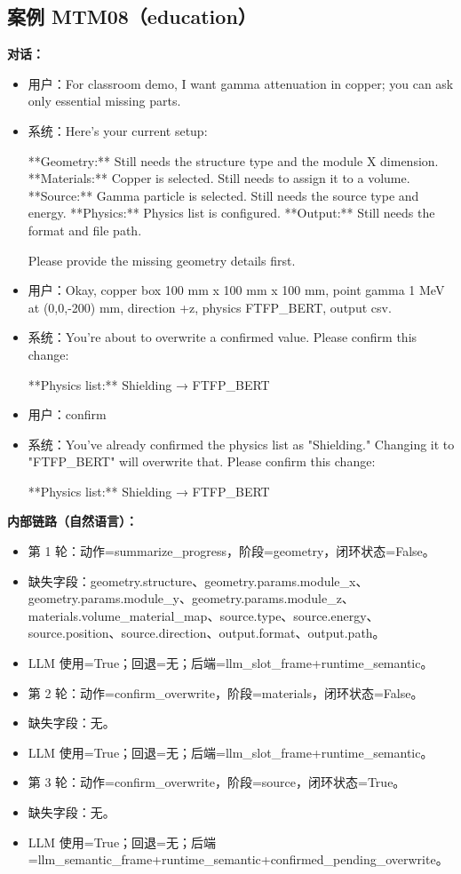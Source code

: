 \documentclass[11pt]{ctexart}
\begin{document}
\subsection{案例 MTM08（education）}
\textbf{对话：}
\begin{itemize}
\item 用户：For classroom demo, I want gamma attenuation in copper; you can ask only essential missing parts.
\item 系统：Here's your current setup:

**Geometry:** Still needs the structure type and the module X dimension.
**Materials:** Copper is selected. Still needs to assign it to a volume.
**Source:** Gamma particle is selected. Still needs the source type and energy.
**Physics:** Physics list is configured.
**Output:** Still needs the format and file path.

Please provide the missing geometry details first.
\item 用户：Okay, copper box 100 mm x 100 mm x 100 mm, point gamma 1 MeV at (0,0,-200) mm, direction +z, physics FTFP\_BERT, output csv.
\item 系统：You're about to overwrite a confirmed value. Please confirm this change:

**Physics list:** Shielding → FTFP\_BERT
\item 用户：confirm
\item 系统：You've already confirmed the physics list as "Shielding." Changing it to "FTFP\_BERT" will overwrite that. Please confirm this change:

**Physics list:** Shielding → FTFP\_BERT
\end{itemize}
\textbf{内部链路（自然语言）：}
\begin{itemize}
\item 第 1 轮：动作=summarize\_progress，阶段=geometry，闭环状态=False。
\item 缺失字段：geometry.structure、geometry.params.module\_x、geometry.params.module\_y、geometry.params.module\_z、materials.volume\_material\_map、source.type、source.energy、source.position、source.direction、output.format、output.path。
\item LLM 使用=True；回退=无；后端=llm\_slot\_frame+runtime\_semantic。
\item 第 2 轮：动作=confirm\_overwrite，阶段=materials，闭环状态=False。
\item 缺失字段：无。
\item LLM 使用=True；回退=无；后端=llm\_slot\_frame+runtime\_semantic。
\item 第 3 轮：动作=confirm\_overwrite，阶段=source，闭环状态=True。
\item 缺失字段：无。
\item LLM 使用=True；回退=无；后端=llm\_semantic\_frame+runtime\_semantic+confirmed\_pending\_overwrite。
\end{itemize}
\end{document}
